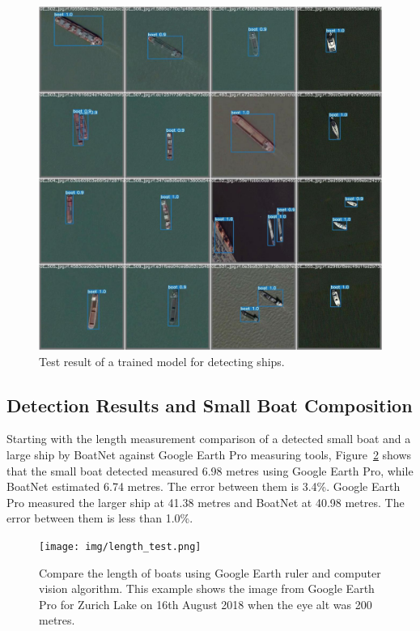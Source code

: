 \begin{figure}[!t]
    \centerline{\includegraphics[width=\columnwidth]{img/test_batch1_pred.jpeg}}
    \caption{Test result of a trained model for detecting ships.}
    \label{fig:test_batch1_pred}
\end{figure}

\subsection{Detection Results and Small Boat Composition}
Starting with the length measurement comparison of a detected small boat and a large ship by BoatNet against Google Earth Pro measuring tools, Figure~\ref{fig:length_test} shows that the small boat detected measured 6.98 metres using Google Earth Pro, while BoatNet estimated 6.74 metres. The error between them is 3.4\%. Google Earth Pro measured the larger ship at 41.38 metres and BoatNet at 40.98 metres. The error between them is less than 1.0\%.

\begin{figure}[t]
    \center
    \texttt{[image: img/length\_test.png]}
    \caption{Compare the length of boats using Google Earth ruler and computer vision algorithm. This example shows the image from Google Earth Pro for Zurich Lake on 16th August 2018 when the eye alt was 200 metres.}
    \label{fig:length_test}
\end{figure}

